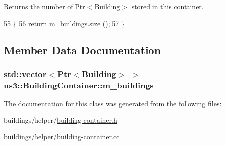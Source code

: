 \begin{DoxyReturn}{Returns}
the number of Ptr$<$\+Building$>$ stored in this container. 
\end{DoxyReturn}

\begin{DoxyCode}
55 \{
56   \textcolor{keywordflow}{return} \hyperlink{classns3_1_1BuildingContainer_a1cf9c298d873d888db65a51c843d3dbc}{m\_buildings}.size ();
57 \}
\end{DoxyCode}


\subsection{Member Data Documentation}
\subsubsection[{\texorpdfstring{m\+\_\+buildings}{m_buildings}}]{\setlength{\rightskip}{0pt plus 5cm}std\+::vector$<${\bf Ptr}$<${\bf Building}$>$ $>$ ns3\+::\+Building\+Container\+::m\+\_\+buildings\hspace{0.3cm}{\ttfamily [private]}}\hypertarget{classns3_1_1BuildingContainer_a1cf9c298d873d888db65a51c843d3dbc}{}\label{classns3_1_1BuildingContainer_a1cf9c298d873d888db65a51c843d3dbc}


The documentation for this class was generated from the following files\+:\begin{DoxyCompactItemize}
\item 
buildings/helper/\hyperlink{building-container_8h}{building-\/container.\+h}\item 
buildings/helper/\hyperlink{building-container_8cc}{building-\/container.\+cc}\end{DoxyCompactItemize}
